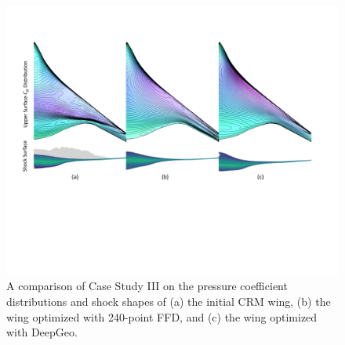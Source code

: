 \begin{figure}[!t]
    \begin{center}
        \includegraphics[width=1\linewidth]{chapter5/fig/bwb_optim_cp.pdf}
    \end{center}
    \caption{
        \small A comparison of Case Study III on the pressure coefficient distributions and shock shapes of (a) the initial CRM wing, (b) the wing optimized with 240-point FFD, and (c) the wing optimized with DeepGeo.
    }
    \label{ch5:fig:cs3_cp}
\end{figure}

